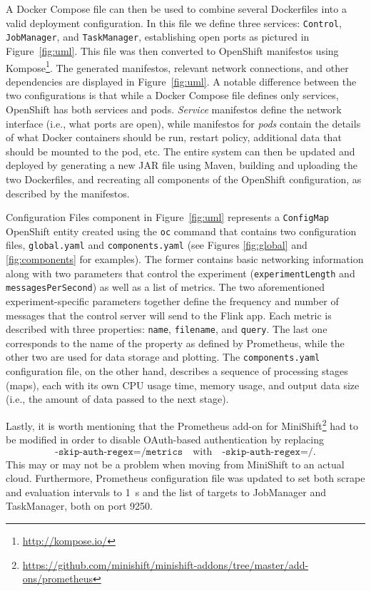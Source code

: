 \documentclass{article}
\begin{document}
A Docker Compose file can then be used to combine several Dockerfiles into a
valid deployment configuration. In this file we define three services:
\texttt{Control}, \texttt{JobManager}, and \texttt{TaskManager}, establishing
open ports as pictured in Figure~\ref{fig:uml}. This file was then converted to
OpenShift manifestos using Kompose\footnote{\url{http://kompose.io/}}. The
generated manifestos, relevant network connections, and other dependencies are
displayed in Figure~\ref{fig:uml}. A notable difference between the two
configurations is that while a Docker Compose file defines only services,
OpenShift has both services and pods. \emph{Service} manifestos define the
network interface (i.e., what ports are open), while manifestos for \emph{pods}
contain the details of what Docker containers should be run, restart policy,
additional data that should be mounted to the pod, etc. The entire system can
then be updated and deployed by generating a new JAR file using Maven, building
and uploading the two Dockerfiles, and recreating all components of the
OpenShift configuration, as described by the manifestos.

Configuration Files component in Figure~\ref{fig:uml} represents a
\texttt{ConfigMap} OpenShift entity created using the \texttt{oc} command that
contains two configuration files, \texttt{global.yaml} and
\texttt{components.yaml} (see Figures \ref{fig:global} and \ref{fig:components}
for examples). The former contains basic networking information along with two
parameters that control the experiment (\texttt{experimentLength} and
\texttt{messagesPerSecond}) as well as a list of metrics. The two aforementioned
experiment-specific parameters together define the frequency and number of
messages that the control server will send to the Flink app. Each metric is
described with three properties: \texttt{name}, \texttt{filename}, and
\texttt{query}. The last one corresponds to the name of the property as defined
by Prometheus, while the other two are used for data storage and plotting. The
\texttt{components.yaml} configuration file, on the other hand, describes a
sequence of processing stages (maps), each with its own CPU usage time, memory
usage, and output data size (i.e., the amount of data passed to the next stage).

Lastly, it is worth mentioning that the Prometheus add-on for
MiniShift\footnote{\url{https://github.com/minishift/minishift-addons/tree/master/add-ons/prometheus}}
had to be modified in order to disable OAuth-based authentication by replacing
\[
  \texttt{-skip-auth-regex=\^{}/metrics} \quad \text{with} \quad
  \texttt{-skip-auth-regex=\^{}/}.
\]
This may or may not be a problem when moving from MiniShift to an actual cloud.
Furthermore, Prometheus configuration file was updated to set both scrape and
evaluation intervals to \SI{1}{\second} and the list of targets to JobManager
and TaskManager, both on port 9250.
\end{document}
